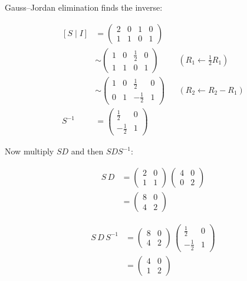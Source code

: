 \documentclass[11pt]{article}
\begin{document}
Gauss--Jordan elimination finds the inverse:

\[\begin{aligned}\left[S\mid I\right] &= \begin{pmatrix}2 & 0 & 1 & 0 \\ 1 & 1 & 0 & 1\end{pmatrix} \\
&\sim \begin{pmatrix}1 & 0 & \frac{1}{2} & 0 \\ 1 & 1 & 0 & 1\end{pmatrix} && \left(R_{1}\leftarrow \frac{1}{2}R_{1}\right) \\
&\sim \begin{pmatrix}1 & 0 & \frac{1}{2} & 0 \\ 0 & 1 & -\frac{1}{2} & 1\end{pmatrix} && \left(R_{2}\leftarrow R_{2}-R_{1}\right) \\
S^{-1} &= \begin{pmatrix}\frac{1}{2} & 0 \\ -\frac{1}{2} & 1\end{pmatrix}\end{aligned}\]

Now multiply \(SD\) and then \(SDS^{-1}\):

\[\begin{aligned}S\,D &= \begin{pmatrix}2 & 0 \\ 1 & 1\end{pmatrix}\,\begin{pmatrix}4 & 0 \\ 0 & 2\end{pmatrix} \\
&= \begin{pmatrix}8 & 0 \\ 4 & 2\end{pmatrix}\end{aligned}\]

\[\begin{aligned}S\,D\,S^{-1} &= \begin{pmatrix}8 & 0 \\ 4 & 2\end{pmatrix}\,\begin{pmatrix}\frac{1}{2} & 0 \\ -\frac{1}{2} & 1\end{pmatrix} \\
&= \begin{pmatrix}4 & 0 \\ 1 & 2\end{pmatrix}\end{aligned}\]
\end{document}
